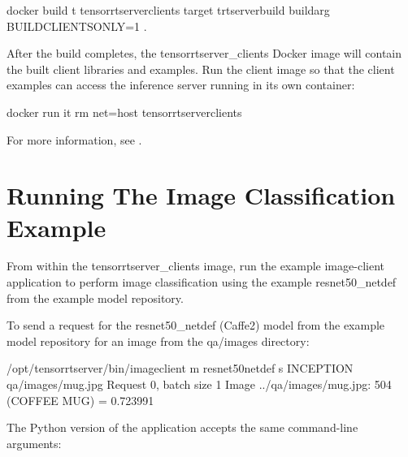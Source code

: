 \documentclass[letterpaper,10pt,english]{sphinxmanual}
\begin{document}
\begin{sphinxVerbatim}[commandchars=\\\{\}]
\PYGZdl{} docker build \PYGZhy{}t tensorrtserver\PYGZus{}clients \PYGZhy{}\PYGZhy{}target trtserver\PYGZus{}build \PYGZhy{}\PYGZhy{}build\PYGZhy{}arg \PYGZdq{}BUILD\PYGZus{}CLIENTS\PYGZus{}ONLY=1\PYGZdq{} .
\end{sphinxVerbatim}

After the build completes, the tensorrtserver\_clients Docker image
will contain the built client libraries and examples. Run the client
image so that the client examples can access the inference server
running in its own container:

\begin{sphinxVerbatim}[commandchars=\\\{\}]
\PYGZdl{} docker run \PYGZhy{}it \PYGZhy{}\PYGZhy{}rm \PYGZhy{}\PYGZhy{}net=host tensorrtserver\PYGZus{}clients
\end{sphinxVerbatim}

For more information, see
{\hyperref[\detokenize{client:section-building-the-client-libraries-and-examples}]{}}.


\section{Running The Image Classification Example}
\label{\detokenize{quickstart:running-the-image-classification-example}}\label{\detokenize{quickstart:section-running-the-image-classification-example}}
From within the tensorrtserver\_clients image, run the example
image-client application to perform image classification using the
example resnet50\_netdef from the example model repository.

To send a request for the resnet50\_netdef (Caffe2) model from the
example model repository for an image from the qa/images directory:

\begin{sphinxVerbatim}[commandchars=\\\{\}]
\PYGZdl{} /opt/tensorrtserver/bin/image\PYGZus{}client \PYGZhy{}m resnet50\PYGZus{}netdef \PYGZhy{}s INCEPTION qa/images/mug.jpg
Request 0, batch size 1
Image \PYGZsq{}../qa/images/mug.jpg\PYGZsq{}:
    504 (COFFEE MUG) = 0.723991
\end{sphinxVerbatim}

The Python version of the application accepts the same command-line
arguments:
\end{document}
